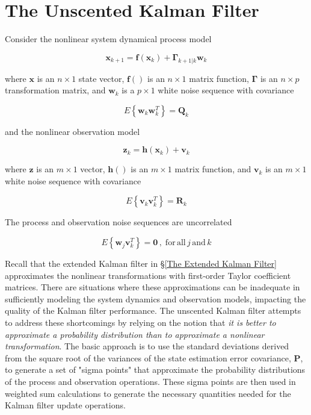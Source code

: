 \section{The Unscented Kalman Filter}
\label{The Unscented Kalman Filter}

Consider the nonlinear system dynamical process model

\begin{equation*}
    \mathbf{x}_{k+1} = \mathbf{f} \left( \mathbf{x}_k \right) + \mathbf{\Gamma}_{k+1|k} \mathbf{w}_k
\end{equation*}

where $\mathbf{x}$ is an $n \times 1$ state vector, $\mathbf{f}()$ is an $n \times 1$
matrix function, $\mathbf{\Gamma}$ is an $n \times p$ transformation matrix, and $\mathbf{w}_k$
is a $p \times 1$ white noise sequence with covariance

\begin{equation*}
    E \left\{ \mathbf{w}_k \mathbf{w}_k^T \right\} = \mathbf{Q}_k
\end{equation*}

and the nonlinear observation model

\begin{equation*}
    \mathbf{z}_k = \mathbf{h} \left( \mathbf{x}_k \right) + \mathbf{v}_k
\end{equation*}

where $\mathbf{z}$ is an $m \times 1$ vector, $\mathbf{h}()$ is an $m \times 1$ matrix
function, and $\mathbf{v}_k$ is an $m \times 1$ white noise sequence with covariance

\begin{equation*}
    E \left\{ \mathbf{v}_k \mathbf{v}_k^T \right\} = \mathbf{R}_k
\end{equation*}

The process and observation noise sequences are uncorrelated

\begin{equation*}
    E \left\{ \mathbf{w}_j \mathbf{v}_k^T \right\} = \mathbf{0} \, , \phantom{.} \mathrm{for} \, \mathrm{all} \, j \, \mathrm{and} \, k
\end{equation*}

Recall that the extended Kalman filter in \S\ref{The Extended Kalman Filter} approximates
the nonlinear transformations with first-order Taylor coefficient matrices. There are
situations where these approximations can be inadequate in sufficiently modeling the
system dynamics and observation models, impacting the quality of the Kalman filter
performance. The unscented Kalman filter attempts to address these shortcomings by
relying on the notion that
\textit{it is better to approximate a probability distribution than to approximate a nonlinear transformation}.
The basic approach is to use the standard deviations derived from the square root of the
variances of the state estimation error covariance, $\mathbf{P}$, to generate a set of
"sigma points" that approximate the probability distributions of the process and
observation operations. These sigma points are then used in weighted sum calculations
to generate the necessary quantities needed for the Kalman filter update operations.

